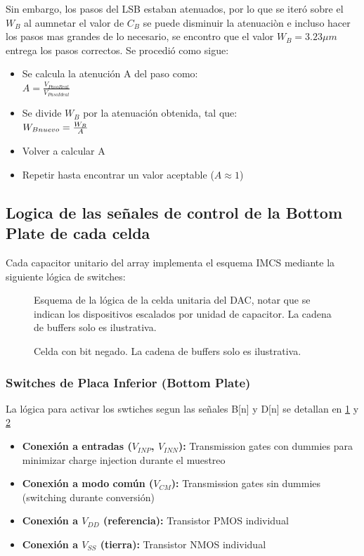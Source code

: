 \documentclass[12pt,a4paper]{report}
\begin{document}
Sin embargo, los pasos del LSB estaban atenuados, por lo que se iteró sobre el $W_B$ al aumnetar el valor de $C_B$ se puede disminuir la atenuaciòn e incluso hacer los pasos mas grandes de lo necesario, se encontro que el valor $W_B=3.23\mu m $ entrega los pasos correctos. Se procedió como sigue:
\begin{itemize}
    \item Se calcula la atenución A del paso como:\\
    $ A = \frac{V_{PasoReal}}{V_{PasoIdeal}}$
    \item Se divide $W_B$ por la atenuación obtenida, tal que:\\
    $W_{B \space nuevo} = \frac{W_B}{A} $
    \item Volver a calcular A
    \item Repetir hasta encontrar un valor aceptable ($A\approx1$)
\end{itemize}

\subsection{Logica de las señales de control de la Bottom Plate de cada celda}

Cada capacitor unitario del array implementa el esquema IMCS mediante la siguiente lógica de switches:

\begin{figure}[H]
    \centering
    
    \caption{Esquema de la lógica de la celda unitaria del DAC, notar que se indican los dispositivos escalados por unidad de capacitor. La cadena de buffers solo es ilustrativa.} 
    \label{botcdac}
\end{figure}

\begin{figure}[H]
    \centering
    
    \caption{Celda con bit negado. La cadena de buffers solo es ilustrativa.}
    \label{botcdacn}
\end{figure}
\subsubsection{Switches de Placa Inferior (Bottom Plate)}
La lógica para activar los swtiches segun las señales B[n] y D[n] se detallan en \cref{botcdac} y \cref{botcdacn}
\begin{itemize}
    \item \textbf{Conexión a entradas ($V_{INP}$, $V_{INN}$):} Transmission gates con dummies para minimizar charge injection durante el muestreo
    \item \textbf{Conexión a modo común ($V_{CM}$):} Transmission gates sin dummies (switching durante conversión)
    \item \textbf{Conexión a $V_{DD}$ (referencia):} Transistor PMOS individual
    \item \textbf{Conexión a $V_{SS}$ (tierra):} Transistor NMOS individual
\end{itemize}
\end{document}
